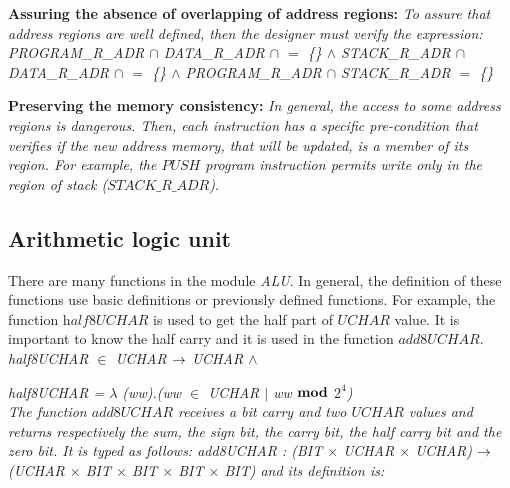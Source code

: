\documentclass[a4paper]{llncs}
\begin{document}
\textbf{Assuring the absence of overlapping of address regions:}
 \emph{To assure that address regions are well defined, then the designer must verify the expression:}
\it PROGRAM\_R\_ADR $\cap$ DATA\_R\_ADR $\cap$ $=$ \{\} $\land$ STACK\_R\_ADR $\cap$ DATA\_R\_ADR $\cap$ $=$ \{\} $\land$ PROGRAM\_R\_ADR $\cap$  STACK\_R\_ADR  $=$ \{\} \rm
 
\textbf{Preserving the memory consistency:} \emph{In general, the access to
some address regions is dangerous. Then, each instruction has a specific pre-condition that verifies
if the new address memory, that will be updated, is a member of its region. For example, the $\textit{PUSH}$
program instruction permits write only in the region of stack ($\textit{STACK\_R\_ADR}$\rm).}



\subsection{Arithmetic logic unit}
 
There are many functions in the module \textit{ALU}. In general, the definition of these 
functions use basic definitions or previously defined functions. For example, the function
$\textit{half8UCHAR}$ is used to get the half part of $\textit{UCHAR}$ value.
It is important to know the half carry and it is used in the function $\textit{add8UCHAR}$. \\

\hspace*{0.0in}\it half8UCHAR  $\in$  \it UCHAR  $\fun$  \it UCHAR  $\land$ 

\hspace*{0.0in}\it half8UCHAR \rm =  $\lambda$  \rm (\it ww\rm )\rm .\rm (\it ww  $\in$  \it UCHAR  $\mid$  \it ww  $\mod$  \it $2^{4}$\rm )\\


 
The function $\textit{add8UCHAR}$ receives a bit carry and two $\textit{UCHAR}$ values and returns respectively the 
sum, the sign bit, the carry bit, the half carry bit and the zero bit. It is typed as follows: \it add8UCHAR \rm :
\rm (\it BIT $\times$ \it UCHAR $\times$ \it UCHAR\rm ) $\fun$ \rm (\it UCHAR $\times$  \it BIT  $\times$  \it BIT  $\times$  \it BIT  $\times$  \it BIT\rm ) and its definition is:\\
\end{document}
